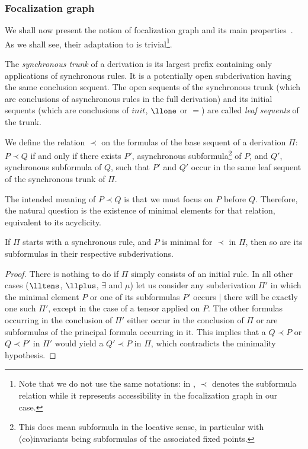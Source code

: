 \subsubsection{Focalization graph}

We shall now present the notion of focalization graph
and its main properties~\cite{miller07cslb}.
As we shall see, their adaptation to \mumall{}
is trivial\footnote{
  Note that we do not use the same notations:
  in \cite{miller07cslb}, ${\prec}$ denotes the subformula relation
  while it represents accessibility in the focalization graph in our case.
}.

\begin{definition}
The \emph{synchronous trunk} of a derivation is its largest prefix
containing only applications of synchronous rules.
It is a potentially open subderivation having the same conclusion sequent.
The open sequents of the synchronous trunk (which are conclusions
of asynchronous rules in the full derivation) and its initial sequents
(which are conclusions of $init$, $\llone$ or ${=}$)
are called \emph{leaf sequents} of the trunk.
\end{definition}

\begin{definition}
We define the relation $\prec$ on the formulas of
the base sequent of a derivation $\Pi$:
$P\prec Q$ if and only if
there exists $P'$, asynchronous subformula\footnote{
  This does mean subformula in the locative sense,
  in particular with (co)invariants being subformulas of
  the associated fixed points.
} of $P$,
and $Q'$, synchronous subformula of $Q$,
such that $P'$ and $Q'$ occur in the same
leaf sequent of the synchronous trunk of $\Pi$.
\end{definition}

The intended meaning of $P\prec Q$ is that we must focus on $P$ before $Q$.
Therefore, the natural question is the existence of minimal elements for that 
relation, equivalent to its acyclicity.

\begin{proposition} \label{prop:mini_subform}
If $\Pi$ starts with a synchronous rule,
and $P$ is minimal for $\prec$ in $\Pi$,
then so are its subformulas in their respective subderivations.
\end{proposition}

\begin{proof}
There is nothing to do
if $\Pi$ simply consists of an initial rule.
In all other cases
($\lltens$, $\llplus$, $\exists$ and $\mu$)
let us consider any subderivation $\Pi'$ in which
the minimal element $P$ or one of its subformulas $P'$ occurs
| there will be exactly one such $\Pi'$, except in the case of a tensor
applied on $P$.
The other formulas occurring in the conclusion of $\Pi'$
either occur in the conclusion of $\Pi$ or are subformulas
of the principal formula occurring in it.
This implies that a $Q\prec P$ or $Q\prec P'$ in $\Pi'$
would yield a $Q'\prec P$ in $\Pi$,
which contradicts the minimality hypothesis.
\end{proof}

